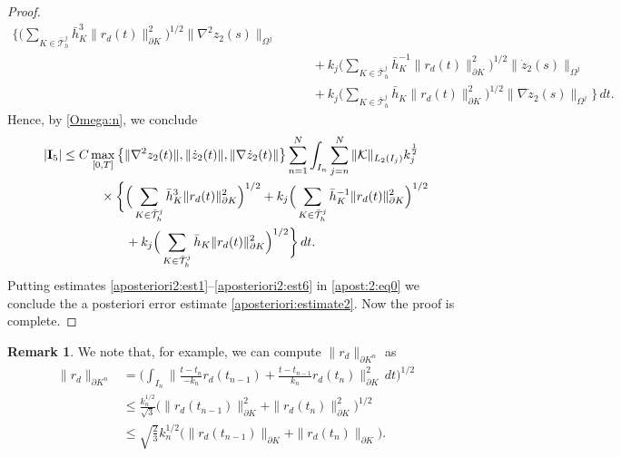 \documentclass{amsart}
\numberwithin{equation}{section}
\theoremstyle{definition}
\newtheorem{remark}{Remark}
\begin{document}
\begin{proof}
\begin{equation*}
\begin{split}
       \bigg\{
       \Big(\sum_{K\in\bar{\mathcal T}_h^j}\bar h_K^3 \|r_d(t)\|_{\partial K}^2\Big)^{1/2} 
       \| \nabla^2 z_2(s)\|_{\Omega^j} \\
      &\qquad
       +k_j\Big(\sum_{K\in\bar{\mathcal T}_h^j}\bar h_K^{-1}\|r_d(t)\|_{\partial K}^2\Big)^{1/2} 
       \| \dot z_2(s)\|_{\Omega^j} \\
      &\qquad 
       +k_j\Big(\sum_{K\in\bar{\mathcal T}_h^j}\bar h_K \|r_d(t)\|_{\partial K}^2\Big)^{1/2} 
       \| \nabla \dot z_2(s)\|_{\Omega^j} \bigg\}\,dt.
  \end{split}
\end{equation*}
Hence, by \eqref{Omega:n}, we conclude 
\begin{equation}   \label{aposteriori2:est6}
  \begin{split}
   | {\rm{\bf I}}_5 |
   &\leq C \max_{[0,T]}
     \big\{\|\nabla^{2}z_2(t)\|,
     \|\dot z_2(t)\|,
     \|\nabla\dot z_2(t)\|\big\}
  
     \sum_{n=1}^N\int_{I_n}\sum_{j=n}^N
      \|{\mathcal K}\|_{L_2(I_j)} k_j^{\frac{1}{2}}\\
   &\qquad\quad\times 
       \bigg\{
       \Big(\sum_{K\in\bar{\mathcal T}_h^j}\bar h_K^3 \|r_d(t)\|_{\partial K}^2\Big)^{1/2} 
       +k_j\Big(\sum_{K\in\bar{\mathcal T}_h^j}\bar h_K^{-1} 
          \|r_d(t)\|_{\partial K}^2\Big)^{1/2}\\
   &\qquad\qquad\quad 
       +k_j\Big(\sum_{K\in\bar{\mathcal T}_h^j}\bar h_K \|r_d(t)\|_{\partial K}^2\Big)^{1/2}       
         \bigg\}\,dt.
  \end{split}
\end{equation}
Putting estimates \eqref{aposteriori2:est1}--\eqref{aposteriori2:est6} in 
\eqref{apost:2:eq0} we conclude the  a posteriori error estimate 
\eqref{aposteriori:estimate2}. Now the proof is complete. 
\end{proof}
\begin{remark}
We note that, for example, we can compute $\|r_d\|_{\partial K^n}$ as
\begin{equation*}
  \begin{split}
     \|r_d\|_{\partial K^n}
    &=\Big(\int_{I_n}\!\big\|\frac{t-t_n}{-k_n}r_d(t_{n-1})
     +\frac{t-t_{n-1}}{k_n}r_d(t_n)\big\|_{\partial K}^2\, dt\Big)^{1/2}\\
    &\le \frac{k_n^{1/2}}{\sqrt{3}}\Big(\|r_d(t_{n-1})
     \|_{\partial K}^2
     +\|r_d({t_n})\|_{\partial K}^2\Big)^{1/2}\\
    &\le \sqrt{\frac{2}{3}}k_n^{1/2}\big(\|r_d(t_{n-1})
     \|_{\partial K}+\|r_d({t_n})\|_{\partial K}\big).
  \end{split}
\end{equation*}
\end{remark}
\end{document}
